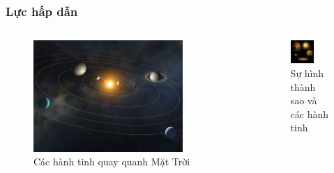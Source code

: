 \begin{frame}
    \frametitle{Lực hấp dẫn}
    \begin{columns}
    \begin{column}{0.5\textwidth}
        \begin{figure}
        \centering
        \includegraphics[width=0.8\textwidth,keepaspectratio]{Slides/Figure/solarsystem.jpg}
        \caption{Các hành tinh quay quanh Mặt Trời}
        \end{figure}
    \end{column}
    \begin{column}{0.5\textwidth}
        \begin{figure}
        \centering
        \includegraphics[width=0.6\textwidth,keepaspectratio]{Slides/Figure/planetformation.jpg}
        \caption{Sự hình thành sao và các hành tinh}
        \end{figure}
    \end{column}
    \end{columns}
\end{frame}

